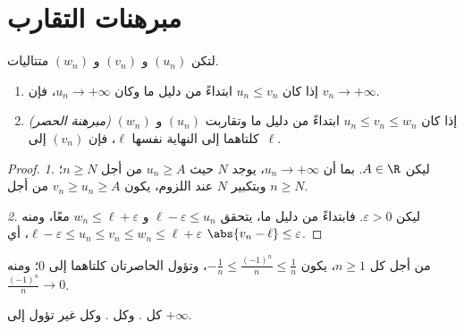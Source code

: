 \section{مبرهنات التقارب}

\begin{theorem}\label{thm:g12:seq:squeeze}
لتكن $(u_n)$ و $(v_n)$ و $(w_n)$ متتاليات.
\begin{enumerate}
  \item إذا كان $u_n \leq v_n$ ابتداءً من دليل ما وكان $u_n \to +\infty$، فإن
        $v_n \to +\infty$.
  \item \emph{(مبرهنة الحصر)} إذا كان
        $u_n \leq v_n \leq w_n$ ابتداءً من دليل ما وتقاربت $(u_n)$ و $(w_n)$
        كلتاهما إلى النهاية نفسها $\ell$، فإن $(v_n)$ 
        إلى~$\ell$.
\end{enumerate}
\end{theorem}

\begin{proof}
\emph{1.} ليكن $A \in \R$. بما أن $u_n \to +\infty$، يوجد $N$ حيث
$u_n \geq A$ من أجل $n \geq N$؛ وبتكبير $N$ عند اللزوم، يكون $v_n \geq u_n \geq A$
من أجل $n \geq N$.

\emph{2.} ليكن $\varepsilon > 0$. فابتداءً من دليل ما، يتحقق
$\ell - \varepsilon \leq u_n$ و $w_n \leq \ell + \varepsilon$ معًا، ومنه
$\ell - \varepsilon \leq u_n \leq v_n \leq w_n \leq \ell + \varepsilon$، أي
$\abs{v_n - \ell} \leq \varepsilon$.
\end{proof}

\begin{example}
من أجل كل $n \geq 1$، يكون $-\frac{1}{n} \leq \frac{(-1)^n}{n} \leq \frac{1}{n}$، وتؤول
الحاصرتان كلتاهما إلى $0$؛ ومنه $\frac{(-1)^n}{n} \to 0$.
\end{example}

\begin{theorem}\label{thm:g12:seq:monotone}
كل    . وكل  
 . وكل   غير  تؤول إلى $+\infty$.
\end{theorem}

